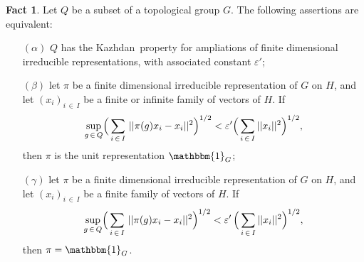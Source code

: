 \documentclass[11pt,english,a4paper]{smfart}
\numberwithin{equation}{section}
\theoremstyle{definition}
\newtheorem{fact}[theorem]{Fact}
\begin{document}
\begin{fact}\label{Fact 6.1.2} Let ${Q}$ be a subset of a topological group $G$. The following assertions are equivalent:
\par\smallskip
\begin{itemize}
 \item [$(\alpha )$]\label{a} ${Q}$ has the {Kazhdan}\ property for ampliations of 
finite dimensional irreducible 
representations, with associated constant $\varepsilon '$;
\item [$(\beta )$]\label{b} let $\pi$ be a finite dimensional irreducible 
representation of $G$ on $H$, and let
$(x_{i})_{i\,\in\,I}$ be a finite or infinite family of vectors of $H$. If
\[
\sup_{g\,\in\,{Q}}\Bigl({\displaystyle}\sum_{i\,\in\,I}\,||\pi (g)x_{i}-x_{i}||^{2} 
\Bigr)^{1/2}<\varepsilon '\Bigl({\displaystyle}\sum_{i\,\in\,I}||x_{i}||^{2}\Bigr)^{1/2},
\]
 then $\pi $ is the unit representation $\mathbbm{1}_{G}$;
\item [$(\gamma )$]\label{c} let $\pi$ be a finite dimensional irreducible 
representation of $G$ on $H$, and let
$(x_{i})_{i\,\in\,I}$ be a finite family of vectors of $H$. If
\[
\sup_{g\,\in\,{Q}}\Bigl({\displaystyle}\sum_{i\,\in\,I}\,||\pi (g)x_{i}-x_{i}||^{2} 
\Bigr)^{1/2}<{\varepsilon '}\, \Bigl({\displaystyle}\sum_{i\,\in\,I}||x_{i}||^{2}\Bigr)^{1/2},
\]
 then $\pi =\mathbbm{1}_{G}$.
\end{itemize}
\end{fact}
\end{document}
